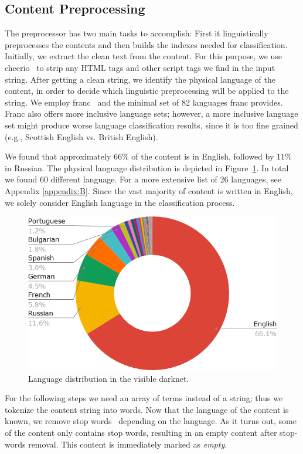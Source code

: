 \documentclass[USenglish,oneside,twocolumn]{article}
\begin{document}
\subsection{Content Preprocessing}
The preprocessor has two main tasks to accomplish: First it linguistically preprocesses the contents and then builds the indexes needed for classification. 
Initially, we extract the clean text from the content.
For this purpose, we use cheerio~\cite{cheeriojs} to strip any HTML tags and other script tags we find in the input string.
After getting a clean string, we identify the physical language of the content, in order to decide which linguistic preprocessing will be applied to the string.
We employ franc~\cite{WormerFranc} and the minimal set of 82 languages franc provides. Franc also offers more inclusive language sets; however, a more inclusive language set might produce worse language classification results, since it is too fine grained (e.g., Scottish English vs. British English).

We found that approximately $66\%$ of the content is in English, followed by $11\%$ in Russian. The physical language distribution is depicted in Figure~\ref{fig:languages}. In total we found 60 different language. For a more extensive list of 26 languages, see Appendix \ref{appendix:B}. Since the vast majority of content is written in English, we solely consider English language in the classification process.

\begin{figure}
\includegraphics[width=\linewidth]{images/contentsByLanguage.png}
\caption{Language distribution in the visible darknet.}
\label{fig:languages}
\end{figure}
For the following steps we need an array of terms instead of a string; thus we tokenize the content string into words.
Now that the language of the content is known, we remove stop words~\cite{McDowall} depending on the language. As it turns out, some of the content only contains stop words, resulting in an empty content after stop-words removal. This content is immediately marked as \emph{empty}.
\end{document}
